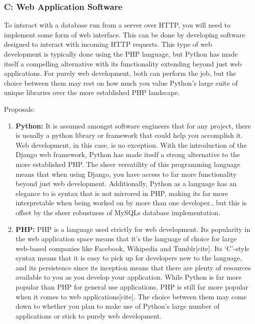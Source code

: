 \subsubsection{C: Web Application Software}

To interact with a database run from a server over HTTP, you will need to implement some form of web interface. This can be done by developing software designed to interact with incoming HTTP requests. This type of web development is typically done using the PHP language, but Python has made itself a compelling alternative with its functionality extending beyond just web applications. For purely web development, both can perform the job, but the choice between them may rest on how much you value Python’s large suite of unique libraries over the more established PHP landscape.

Proposals:

\begin{enumerate}
    \item \textbf{Python:} It is assumed amongst software engineers that for any project, there is usually a python library or framework that could help you accomplish it. Web development, in this case, is no exception. With the introduction of the Django web framework, Python has made itself a strong alternative to the more established PHP. The sheer versatility of this programming language means that when using Django, you have access to far more functionality beyond just web development. Additionally, Python as a language has an elegance to is syntax that is not mirrored in PHP, making its far more interpretable when being worked on by more than one developer., but this is offset by the sheer robustness of MySQLs database implementation.
    \item \textbf{PHP:} PHP is a language used strictly for web development. Its popularity in the web application space means that it’s the language of choice for large web-based companies like Facebook, Wikipedia and Tumblr[cite]. Its ‘C’-style syntax means that it is easy to pick up for developers new to the language, and its persistence since its inception means that there are plenty of resources available to you as you develop your application. While Python is far more popular than PHP for general use applications, PHP is still far more popular when it comes to web applications[cite]. The choice between them may come down to whether you plan to make use of Python’s large number of applications or stick to purely web development.
\end{enumerate}

